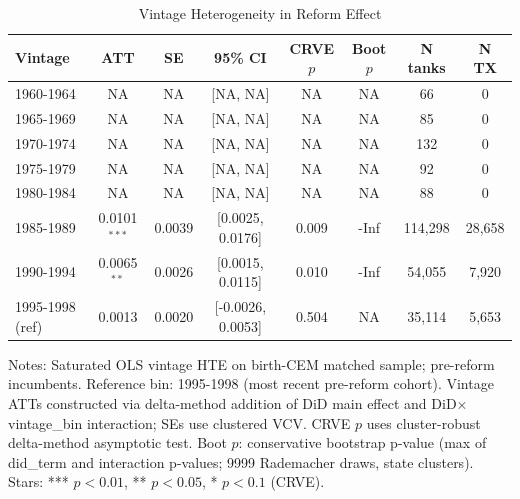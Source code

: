 \begin{table}[htbp]
\centering
\caption{Vintage Heterogeneity in Reform Effect}
\label{tbl:vintage_hte_ols}
\begin{tabular}{lccccccc}
\toprule
Vintage & ATT & SE & 95\% CI & CRVE $p$ & Boot $p$ & N tanks & N TX \\
\midrule
1960-1964 & NA & NA & [NA, NA] & NA & NA & 66 & 0 \\
1965-1969 & NA & NA & [NA, NA] & NA & NA & 85 & 0 \\
1970-1974 & NA & NA & [NA, NA] & NA & NA & 132 & 0 \\
1975-1979 & NA & NA & [NA, NA] & NA & NA & 92 & 0 \\
1980-1984 & NA & NA & [NA, NA] & NA & NA & 88 & 0 \\
1985-1989 & 0.0101$^{***}$ & 0.0039 & [0.0025, 0.0176] & 0.009 & -Inf & 114,298 & 28,658 \\
1990-1994 & 0.0065$^{**}$ & 0.0026 & [0.0015, 0.0115] & 0.010 & -Inf & 54,055 & 7,920 \\
1995-1998 (ref) & 0.0013 & 0.0020 & [-0.0026, 0.0053] & 0.504 & NA & 35,114 & 5,653 \\
\bottomrule
\end{tabular}
\par\raggedright
Notes: Saturated OLS vintage HTE on birth-CEM matched sample; pre-reform incumbents. Reference bin: 1995-1998 (most recent pre-reform cohort). Vintage ATTs constructed via delta-method addition of DiD main effect and DiD$\times$vintage\_bin interaction; SEs use clustered VCV. CRVE $p$ uses cluster-robust delta-method asymptotic test. Boot $p$: conservative bootstrap p-value (max of did\_term and interaction p-values; 9999 Rademacher draws, state clusters). Stars: *** $p<0.01$, ** $p<0.05$, * $p<0.1$ (CRVE).
\end{table}
